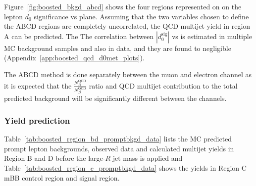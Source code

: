 Figure~\ref{fig:boosted_bkgd_abcd} shows the four regions represented on on the lepton $d_{0}$ significance vs \met plane.
Assuming that the two variables chosen to define the ABCD regions are completely uncorrelated, the QCD multijet yield in region A can be predicted. The The correlation between $|d_{0}^{\textrm{sig}}|$ vs \met is estimated in multiple MC background samples and also in data, and they are found to negligible (Appendix~\ref{app:boosted_qcd_d0met_plots}).
 
The ABCD method is done separately between the muon and electron channel as it is expected that the $\frac{N_B^\text{QCD}}{N_D^\text{QCD}}$ ratio and QCD multijet contribution to the total predicted background will be significantly different between the channels.
 
%
%
\subsubsection{Yield prediction}
\label{sec:boosted_bkgd_qcdmultijet_yield}
 
Table~\ref{tab:boosted_region_bd_promptbkgd_data} lists the MC predicted prompt lepton backgrounds, observed data
and calculated multijet yields in Region B and D before the large-$R$ jet mass is applied and Table~\ref{tab:boosted_region_c_promptbkgd_data}
shows the yields in Region C mBB control region and signal region.
 
